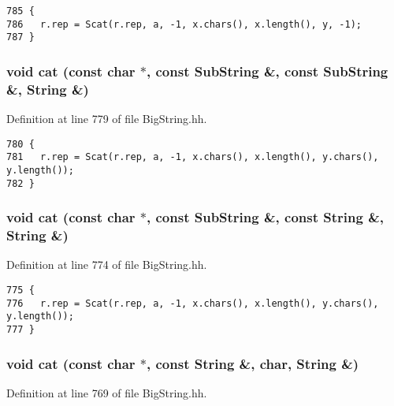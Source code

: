 \footnotesize\begin{verbatim}785 {
786   r.rep = Scat(r.rep, a, -1, x.chars(), x.length(), y, -1);
787 }
\end{verbatim}\normalsize 
{}
\subsubsection{\setlength{\rightskip}{0pt plus 5cm}void cat (const char $\ast$, const {\bf Sub\-String} \&, const {\bf Sub\-String} \&, String \&)\hspace{0.3cm}{\tt  [friend]}}\label{classString_l30}




Definition at line 779 of file Big\-String.hh.



\footnotesize\begin{verbatim}780 {
781   r.rep = Scat(r.rep, a, -1, x.chars(), x.length(), y.chars(), y.length());
782 }
\end{verbatim}\normalsize 
{}
\subsubsection{\setlength{\rightskip}{0pt plus 5cm}void cat (const char $\ast$, const {\bf Sub\-String} \&, const String \&, String \&)\hspace{0.3cm}{\tt  [friend]}}\label{classString_l29}




Definition at line 774 of file Big\-String.hh.



\footnotesize\begin{verbatim}775 {
776   r.rep = Scat(r.rep, a, -1, x.chars(), x.length(), y.chars(), y.length());
777 }
\end{verbatim}\normalsize 
{}
\subsubsection{\setlength{\rightskip}{0pt plus 5cm}void cat (const char $\ast$, const String \&, char, String \&)\hspace{0.3cm}{\tt  [friend]}}\label{classString_l28}




Definition at line 769 of file Big\-String.hh.



